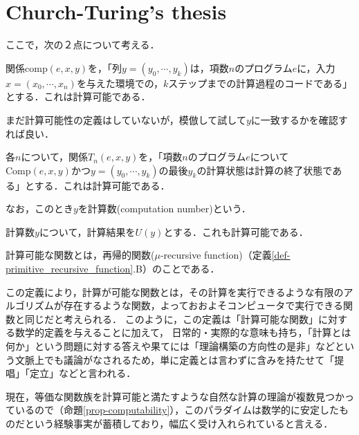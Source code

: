 \documentclass[uplatex, dvipdfmx]{jsreport}
\begin{document}
\section{Church-Turing's thesis}

ここで，次の２点について考える．
\begin{proposition}[関係comp]
    関係$\mathrm{comp}(e,x,y)$を，「列$y=(y_0,\cdots,y_k)$は，項数$n$のプログラム$e$に，入力$x=(x_0,\cdots,x_n)$を与えた環境での，$k$ステップまでの計算過程のコードである」とする．これは計算可能である．
\end{proposition}
まだ計算可能性の定義はしていないが，模倣して試して$y$に一致するかを確認すれば良い．
\begin{proposition}
    各$n$について，関係$T_n(e,x,y)$を，「項数$n$のプログラム$e$について$\mathrm{Comp}(e,x,y)$かつ$y=(y_0,\cdots,y_k)$の最後$y_k$の計算状態は計算の終了状態である」とする．これは計算可能である．

    なお，このとき$y$を計算数(computation number)という．
\end{proposition}
\begin{proposition}
    計算数$y$について，計算結果を$U(y)$とする．これも計算可能である．
\end{proposition}

\begin{definition}\label{def-Church-Turing's thesis}
    計算可能な関数とは，再帰的関数($\mu$-recursive function)（定義\ref{def-primitive_recursive_function}.B）のことである．
\end{definition}
\begin{remark}
    この定義により，計算が可能な関数とは，その計算を実行できるような有限のアルゴリズムが存在するような関数，よっておおよそコンピュータで実行できる関数と同じだと考えられる．
    このように，この定義は「計算可能な関数」に対する数学的定義を与えることに加えて，
    日常的・実際的な意味も持ち，「計算とは何か」という問題に対する答えや果てには「理論構築の方向性の是非」などという文脈上でも議論がなされるため，単に定義とは言わずに含みを持たせて「提唱」「定立」などと言われる．

    現在，等価な関数族を計算可能と満たすような自然な計算の理論が複数見つかっているので（命題\ref{prop-computability}），このパラダイムは数学的に安定したものだという経験事実が蓄積しており，幅広く受け入れられていると言える．
\end{remark}
\end{document}
